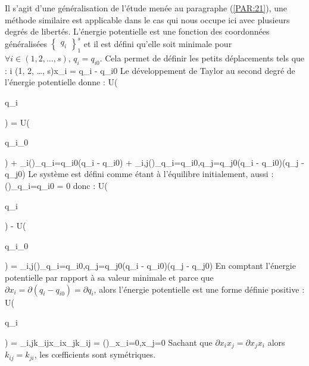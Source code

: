 Il s'agit d'une g\'en\'eralisation de l'\'etude men\'ee au paragraphe (\ref{PAR:21}), une m\'ethode similaire est applicable dans le cas qui nous occupe ici avec plusieurs degr\'es de libert\'es. L'\'energie potentielle est une fonction des coordonn\'ees g\'en\'eralis\'ees $\begin{Bmatrix}q_{i}\end{Bmatrix}^{s}_{1}$ et il est d\'efini qu'elle soit minimale pour $\forall i \in (1, 2, \ldots, s)\text{, }q_{i} = q_{i0}$. Cela permet de d\'efinir les petits d\'eplacements tels que :
\be
	\forall i \in (1, 2, \ldots, s)\text{, }x_{i} = q_{i} - q_{i0} \label{EQ:23_1}
\ee
Le d\'eveloppement de Taylor au second degr\'e de l'\'energie potentielle donne :
\benn
	U(\begin{Bmatrix}q_{i}\end{Bmatrix}) = U(\begin{Bmatrix}q_{i_{0}}\end{Bmatrix}) + \sum_{i}\left(\right)_{q_{i}=q_{i0}}(q_{i} - q_{i0}) + \sum_{i,j}\left(\right)_{q_{i}=q_{i0},q_{j}=q_{j0}}(q_{i} - q_{i0})(q_{j} - q_{j0})
\eenn
Le syst\`eme est d\'efini comme \'etant \`a l'\'equilibre initialement, aussi :
\benn
	\left(\right)_{q_{i}=q_{i0}} = 0
\eenn
donc :
\benn
	U(\begin{Bmatrix}q_{i}\end{Bmatrix}) - U(\begin{Bmatrix}q_{i_{0}}\end{Bmatrix}) = \sum_{i,j}\left(\right)_{q_{i}=q_{i0},q_{j}=q_{j0}}(q_{i} - q_{i0})(q_{j} - q_{j0})
\eenn
En comptant l'\'energie potentielle par rapport \`a sa valeur minimale et parce que $\partial x_{i} = \partial (q_{i} - q_{i0}) = \partial q_{i}$, alors l'\'energie potentielle est une forme d\'efinie positive :
\be
	U(\begin{Bmatrix}q_{i}\end{Bmatrix}) = \sum_{i,j}k_{ij}x_{i}x_{j}k_{ij} = \left(\right)_{x_{i}=0,x_{j}=0} \label{EQ:23_2}
\ee
Sachant que $\partial x_{i}x_{j} = \partial x_{j}x_{i}$ alors $k_{ij} = k_{ji}$, les c{\oe}fficients sont sym\'etriques.

